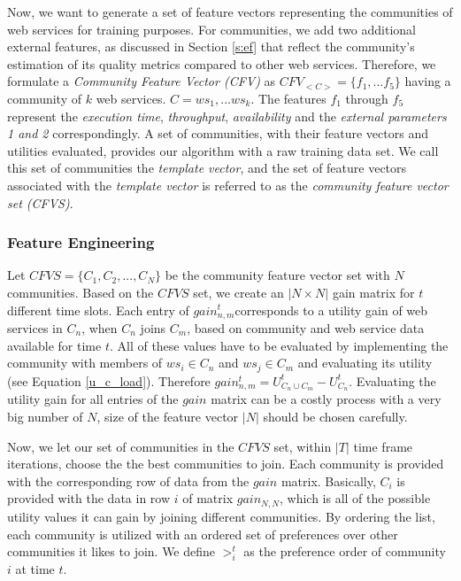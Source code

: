 \documentclass[10pt,journal,cspaper,compsoc]{IEEEtran}
\begin{document}
Now, we want to generate a set of feature vectors representing the communities of web services for training purposes. For communities, we add two additional external features, as discussed in Section \ref{s:ef} that reflect the community's estimation of its quality metrics compared to other web services. Therefore, we formulate a \emph{Community Feature Vector (CFV)} as $CFV_{<C>} = \{f_1,...f_5\}$ having a community of $k$ web services. $C = {ws_1,...ws_k}$. The features $f_1$ through $f_5$ represent the \emph{execution time}, \emph{throughput}, \emph{availability} and the \emph{external parameters 1 and 2} correspondingly. A set of communities, with their feature vectors and utilities evaluated, provides our algorithm with a raw training data set. We call this set of communities the \emph{template vector}, and the set of feature vectors associated with the \emph{template vector} is referred to as the \emph{community feature vector set (CFVS)}.

\subsubsection{Feature Engineering}\label{sss:feng}
Let $CFVS = \{C_1, C_2,..., C_N\}$ be the community feature vector set with $N$ communities. Based on the $CFVS$ set, we create an $|N \times N|$ gain matrix for $t$ different time slots. Each entry of $gain_{n,m}^{t}$corresponds to a utility gain of web services in $C_n$, when $C_n$ joins $C_m$, based on community and web service data available for time $t$. All of these values have to be evaluated by implementing the community with members of $ws_i \in C_n$ and $ws_j \in C_m$ and evaluating its utility (see Equation \ref{u_c_load}). Therefore $gain_{n,m}^{t} = U_{C_n \cup C_m}^{t} - U_{C_{n}}^{t}$. Evaluating the utility gain for all entries of the $gain$ matrix can be a costly process with a very big number of $N$, size of the feature vector $|N|$ should be chosen carefully. 

Now, we let our set of communities in the $CFVS$ set, within $|T|$ time frame iterations, choose the the best communities to join. Each community is provided with the corresponding row of data from the $gain$ matrix. Basically, $C_i$ is provided with the data in row $i$ of matrix $gain_{N,N}$, which is all of the possible utility values it can gain by joining different communities. By ordering the list, each community is utilized with an ordered set of preferences over other communities it likes to join. We define $>_{i}^t$ as the preference order of community $i$ at time $t$.
\end{document}
